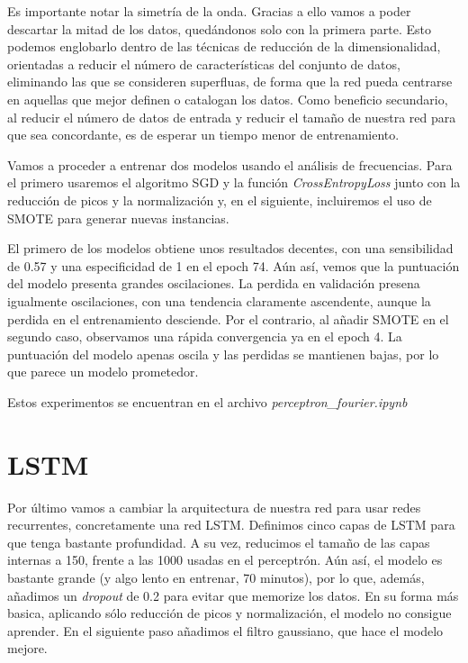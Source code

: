 
Es importante notar la simetría de la onda. Gracias a ello vamos a poder descartar la mitad de los datos, quedándonos solo con la primera parte. Esto podemos englobarlo dentro de las técnicas de reducción de la dimensionalidad, orientadas a reducir el número de características del conjunto de datos, eliminando las que se consideren superfluas, de forma que la red pueda centrarse en aquellas que mejor definen o catalogan los datos. Como beneficio secundario, al reducir el número de datos de entrada y reducir el tamaño de nuestra red para que sea concordante, es de esperar un tiempo menor de entrenamiento.


Vamos a proceder a entrenar dos modelos usando el análisis de frecuencias. Para el primero usaremos el algoritmo SGD y la función \textit{CrossEntropyLoss} junto con la reducción de picos y la normalización y, en el siguiente, incluiremos el uso de SMOTE para generar nuevas instancias. 

El primero de los modelos obtiene unos resultados decentes, con una sensibilidad de 0.57 y una especificidad de 1 en el epoch 74. Aún así, vemos que la puntuación del modelo presenta grandes oscilaciones. La perdida en validación presena igualmente oscilaciones, con una tendencia claramente ascendente, aunque la perdida en el entrenamiento desciende. Por el contrario, al añadir SMOTE en el segundo caso, observamos una rápida convergencia ya en el epoch 4. La puntuación del modelo apenas oscila y las perdidas se mantienen bajas, por lo que parece un modelo prometedor.

Estos experimentos se encuentran en el archivo \textit{perceptron\_fourier.ipynb}

\section{LSTM}

Por último vamos a cambiar la arquitectura de nuestra red para usar redes recurrentes, concretamente una red LSTM. Definimos cinco capas de LSTM para que tenga bastante profundidad. A su vez, reducimos el tamaño de las capas internas a 150, frente a las 1000 usadas en el perceptrón. Aún así, el modelo es bastante grande (y algo lento en entrenar, 70 minutos), por lo que, además, añadimos un \textit{dropout} de 0.2 para evitar que memorize los datos. En su forma más basica, aplicando sólo reducción de picos y normalización, el modelo no consigue aprender. En el siguiente paso añadimos el filtro gaussiano, que hace el modelo mejore.

